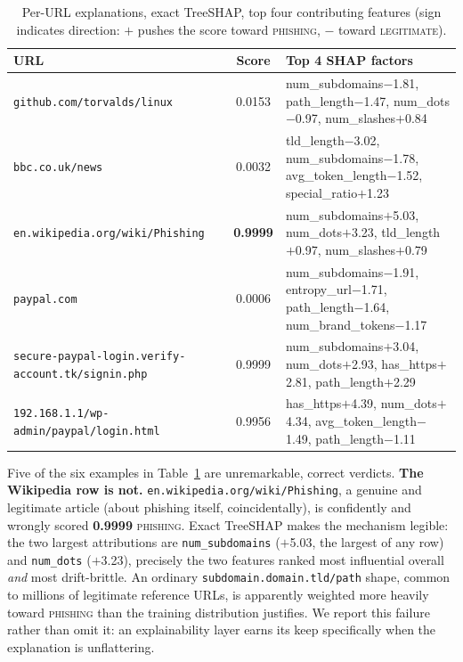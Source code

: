 \documentclass[conference]{IEEEtran}
\begin{document}
\begin{table}[t]
\caption{Per-URL explanations, exact TreeSHAP, top four contributing
features (sign indicates direction: $+$ pushes the score toward
\textsc{phishing}, $-$ toward \textsc{legitimate}).}
\label{tab:shap-examples}
\centering\scriptsize
\setlength{\tabcolsep}{2.5pt}
\begin{tabular}{@{}lcl@{}}
\toprule
\textbf{URL} & \textbf{Score} & \textbf{Top 4 SHAP factors}\\
\midrule
\texttt{github.com/torvalds/linux} & 0.0153 & num\_subdomains$-$1.81, path\_length$-$1.47, num\_dots$-$0.97, num\_slashes$+$0.84\\
\texttt{bbc.co.uk/news} & 0.0032 & tld\_length$-$3.02, num\_subdomains$-$1.78, avg\_token\_length$-$1.52, special\_ratio$+$1.23\\
\texttt{en.wikipedia.org/wiki/Phishing} & \textbf{0.9999} & num\_subdomains$+$5.03, num\_dots$+$3.23, tld\_length$+$0.97, num\_slashes$+$0.79\\
\texttt{paypal.com} & 0.0006 & num\_subdomains$-$1.91, entropy\_url$-$1.71, path\_length$-$1.64, num\_brand\_tokens$-$1.17\\
\texttt{secure-paypal-login.verify-account.tk/signin.php} & 0.9999 & num\_subdomains$+$3.04, num\_dots$+$2.93, has\_https$+$2.81, path\_length$+$2.29\\
\texttt{192.168.1.1/wp-admin/paypal/login.html} & 0.9956 & has\_https$+$4.39, num\_dots$+$4.34, avg\_token\_length$-$1.49, path\_length$-$1.11\\
\bottomrule
\end{tabular}
\end{table}

Five of the six examples in Table~\ref{tab:shap-examples} are
unremarkable, correct verdicts. \textbf{The Wikipedia row is not.}
\texttt{en.wikipedia.org/wiki/Phishing}, a genuine and legitimate article
(about phishing itself, coincidentally), is confidently and wrongly scored \textbf{0.9999} \textsc{phishing}. Exact TreeSHAP makes
the mechanism legible: the two largest attributions are
\texttt{num\_subdomains} ($+$5.03, the largest of any row) and \texttt{num\_dots} ($+$3.23), precisely the two features ranked most
influential overall \emph{and} most drift-brittle. An ordinary
\texttt{subdomain.domain.tld/path} shape, common to millions of
legitimate reference URLs, is apparently weighted more heavily toward
\textsc{phishing} than the training distribution justifies. We report
this failure rather than omit it: an explainability layer earns its keep
specifically when the explanation is unflattering.
\end{document}
